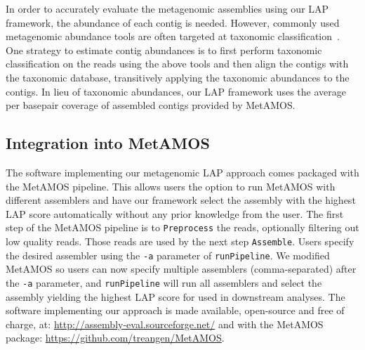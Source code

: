 \documentclass[conference]{IEEEtran}
\begin{document}
In order to accurately evaluate the metagenomic assemblies using our LAP framework, the abundance of each contig is needed.
However, commonly used metagenomic abundance tools are often targeted at taxonomic classification~\cite{segata2012metagenomic,brady2009phymm,liu2010metaphyler,huson2007megan}.
One strategy to estimate contig abundances is to first perform taxonomic classification on the reads using the above tools and then align the contigs with the taxonomic database, transitively applying the taxonomic abundances to the contigs.
In lieu of taxonomic abundances, our LAP framework uses the average per basepair coverage of assembled contigs provided by MetAMOS.

\subsection{Integration into MetAMOS}

The software implementing our metagenomic LAP approach comes packaged with the MetAMOS pipeline.
This allows users the option to run MetAMOS with different assemblers and have our framework select the assembly with the highest LAP score automatically without any prior knowledge from the user.
The first step of the MetAMOS pipeline is to \verb!Preprocess! the reads, optionally filtering out low quality reads.
Those reads are used by the next step \verb!Assemble!.
Users specify the desired assembler using the \verb!-a! parameter of \verb!runPipeline!.
We modified MetAMOS so users can now specify multiple assemblers (comma-separated) after the \verb!-a! parameter, and \verb!runPipeline! will run all assemblers and select the assembly yielding the highest LAP score for used in downstream analyses.
The software implementing our approach is made available, open-source and free of charge, at: \url{http://assembly-eval.sourceforge.net/} and with the MetAMOS package: \url{https://github.com/treangen/MetAMOS}.
\end{document}
